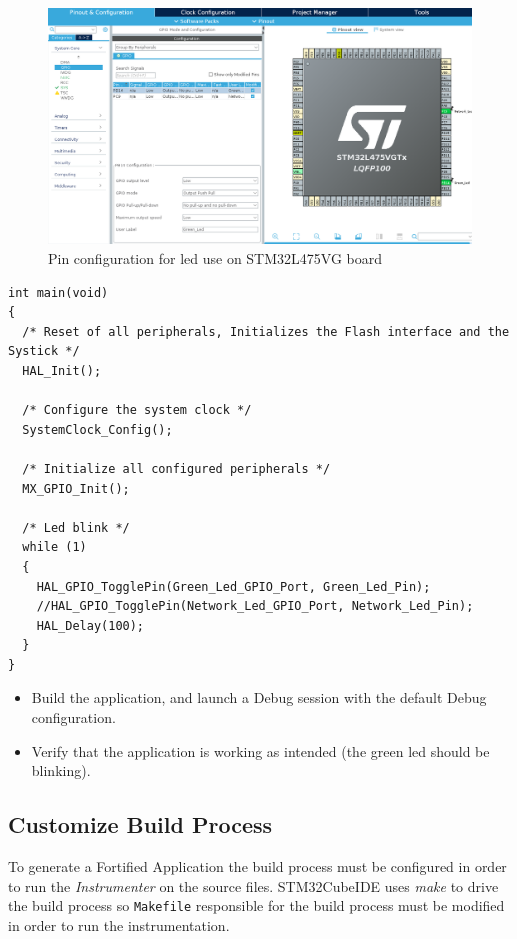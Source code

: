 \documentclass{article}
\begin{document}
\begin{figure}
\centering
\includegraphics[scale=.25]{images/led_config.png}
\caption{Pin configuration for led use on STM32L475VG board}
\label{fig:led_config}
\end{figure}

\begin{lstlisting}[caption={modified main.c file},captionpos=b,label=lst:main]
int main(void)
{
  /* Reset of all peripherals, Initializes the Flash interface and the Systick */
  HAL_Init();
  
  /* Configure the system clock */
  SystemClock_Config();
  
  /* Initialize all configured peripherals */
  MX_GPIO_Init();
  
  /* Led blink */
  while (1)
  {
    HAL_GPIO_TogglePin(Green_Led_GPIO_Port, Green_Led_Pin);
    //HAL_GPIO_TogglePin(Network_Led_GPIO_Port, Network_Led_Pin);
    HAL_Delay(100);
  }
}
\end{lstlisting}

\begin{itemize}
    \item Build the application, and launch a Debug session with the default Debug configuration.
    \item Verify that the application is working as intended (the green led should be blinking).
\end{itemize}


\subsection{Customize Build Process}
To generate a Fortified Application the build process must be configured in order to run the \textit{Instrumenter} on the source files. STM32CubeIDE uses \textit{make} to drive the build process so \verb|Makefile| responsible for the build process must be modified in order to run the instrumentation. 
\end{document}
